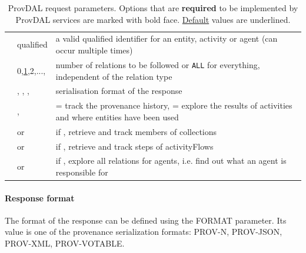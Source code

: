 \begin{table}[h]
\small
\begin{tabulary}{1.0\textwidth}{@{}p{0.17\textwidth}p{0.22\textwidth}p{0.53\textwidth}@{}}
\toprule
{} &  & \\\hline
\midrule
\textbf{} & qualified  & a valid qualified identifier for an entity, activity or agent (can occur multiple times)\\
\textbf{} & 0,\underline{1},2,...,  &  number of relations to be followed or \texttt{ALL} for everything, independent of the relation type\\
\textbf{} & , \newline{}, \newline{}, \newline{} & serialisation format of the response\\\hline
{} & ,  &  = track the provenance history, \newline{} = explore the results of activities and where entities have been used\\
 &  or  & if , retrieve and track members of collections\\
 &  or  & if , retrieve and track steps of activityFlows\\
 &  or  & if , explore all relations for agents, i.e. find out what an agent is responsible for\\
\bottomrule
\end{tabulary}
\caption{ProvDAL request parameters. Options that are \textbf{required} to be implemented by ProvDAL services are marked with bold face. \underline{Default} values are underlined.}
\label{tab:provdal-parameters}
\end{table}


\paragraph{Response format}
The format of the response can be defined using the FORMAT parameter. Its value is one of the provenance serialization formats: PROV-N, PROV-JSON, PROV-XML, PROV-VOTABLE.

